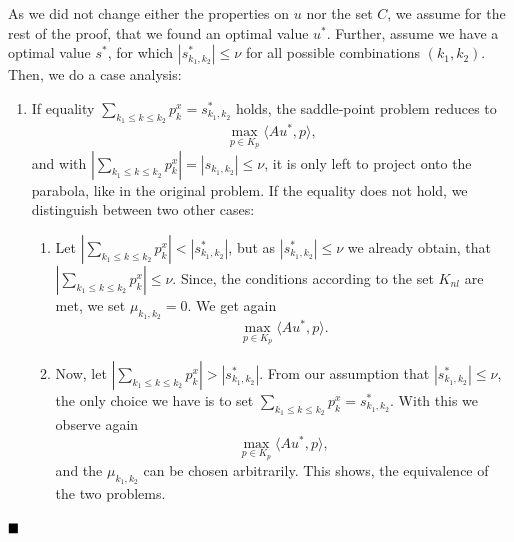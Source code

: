 \documentclass{scrreprt}
\newcommand{\qed}{$\hfill\blacksquare$}
\newenvironment{proof}[1][Proof]{\begin{trivlist}
\item[\hskip \labelsep {\bfseries #1}]}{\end{trivlist}}
\begin{document}
        \begin{proof}
            As we did not change either the properties on $u$ nor the set $C$, we assume for the rest of the proof, that we found an optimal value $u^{\ast}$. Further, assume we have a optimal value $s^{\ast}$, for which $|s^{\ast}_{k_{1}, k_{2}}| \le \nu$ for all possible combinations $(k_{1}, k_{2})$. Then, we do a case analysis:
            \begin{enumerate}
                \item If equality $\sum_{k_{1} \le k \le k_{2}} p^{x}_{k} = s^{\ast}_{k_{1}, k_{2}}$ holds, the saddle-point problem reduces to
                    $$
                        \max_{p \in K_{p}} \langle Au^{\ast}, p \rangle,
                    $$
                and with $\left| \sum_{k_{1} \le k \le k_{2}} p^{x}_{k} \right| = |s_{k_{1}, k_{2}}| \le \nu$, it is only left to project onto the parabola, like in the original problem. If the equality does not hold, we distinguish between two other cases:
                \begin{enumerate}
                    \item Let $\left| \sum_{k_{1} \le k \le k_{2}} p^{x}_{k} \right| < |s^{\ast}_{k_{1}, k_{2}}|$, but as $|s^{\ast}_{k_{1}, k_{2}}| \le \nu$ we already obtain, that $\left|\sum_{k_{1} \le k \le k_{2}} p^{x}_{k}\right| \le \nu$. Since, the conditions according to the set $K_{nl}$ are met, we set $\mu_{k_{1}, k_{2}} = 0$. We get again
                        $$
                            \max_{p \in K_{p}} \langle Au^{\ast}, p \rangle.
                        $$
                    \item Now, let $\left| \sum_{k_{1} \le k \le k_{2}} p^{x}_{k} \right| > |s^{\ast}_{k_{1}, k_{2}}|$.
                    From our assumption that $|s^{\ast}_{k_{1}, k_{2}}| \le \nu$, the only choice we have is to set $\sum_{k_{1} \le k \le k_{2}} p^{x}_{k} = s^{\ast}_{k_{1}, k_{2}}$. With this we observe again
                        $$
                            \max_{p \in K_{p}} \langle Au^{\ast}, p \rangle,
                        $$
                    and the $\mu_{k_{1}, k_{2}}$ can be chosen arbitrarily. This shows, the equivalence of the two problems.
                \end{enumerate}
            \end{enumerate}\qed
        \end{proof}
\end{document}
